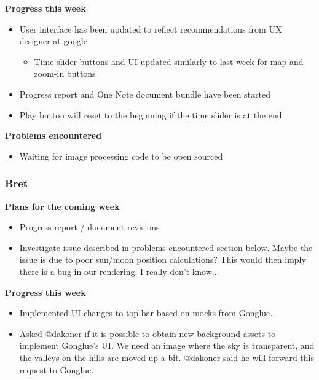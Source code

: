 \documentclass[10pt, onecolumn, draftclsnofoot, letterpaper, compsoc]{IEEEtran}
\begin{document}
    \noindent \textbf{Progress this week}

    \begin{itemize}

    \item User interface has been updated to reflect recommendations from UX designer at google

    \begin{itemize}
       \item Time slider buttons and UI updated similarly to last week for map and zoom-in buttons
    \end{itemize}

    \item Progress report and One Note document bundle have been started
    \item Play button will reset to the beginning if the time slider is at the end

    \end{itemize}

    \noindent \textbf{Problems encountered}

    \begin{itemize}

    \item Waiting for image processing code to be open sourced

    \end{itemize}

    \subsubsection{Bret}

    \noindent \textbf{Plans for the coming week}

    \begin{itemize}

    \item Progress report / document revisions
    \item Investigate issue described in problems encountered section below. Maybe the issue is due to poor sun/moon
      position calculations? This would then imply there is a bug in our rendering. I really don't know...

    \end{itemize}

    \noindent \textbf{Progress this week}

    \begin{itemize}

    \item Implemented UI changes to top bar based on mocks from Gonglue.
    \item Asked @dakoner if it is possible to obtain new background assets to implement Gonglue's UI.
      We need an image where the sky is transparent, and the valleys on the hills are moved up a bit.
      @dakoner said he will forward this request to Gonglue.

    \end{itemize}
\end{document}
